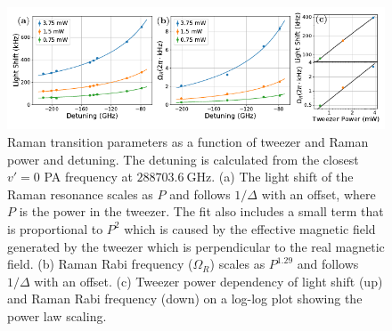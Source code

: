 \documentclass[aps,prl,twocolumn,10pt,superscriptaddress]{revtex4-1}
\begin{document}
\begin{figure}
  \includegraphics[width=\textwidth]{fig4.pdf}
  \caption{Raman transition parameters as a function of tweezer and Raman power and detuning.
    The detuning is calculated from the closest $v'=0$ PA frequency at $288703.6~\mathrm{GHz}$.
    (a) The light shift of the Raman resonance scales as $P$
    and follows $1/\Delta$ with an offset, where $ P$ is the power in the tweezer.
    The fit also includes a small term that is proportional to $P^2$
    which is caused by the effective magnetic field generated by the tweezer which is
    perpendicular to the real magnetic field.
    (b) Raman Rabi frequency ($\Omega_R$) scales as $P^{1.29}$
    and follows $1/\Delta$ with an offset.
    (c) Tweezer power dependency of light shift (up) and Raman Rabi frequency (down)
    on a log-log plot showing the power law scaling.
    \label{f-det}}
\end{figure}
\end{document}
